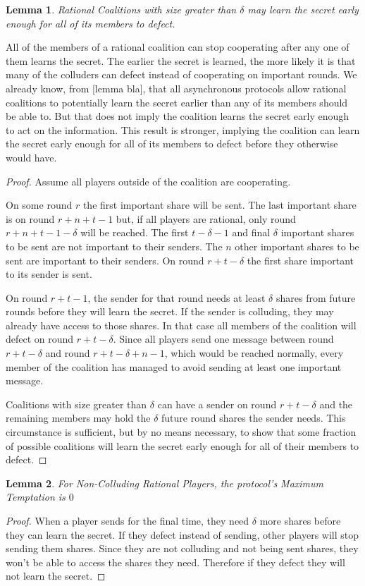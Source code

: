 \documentclass{dalcsthesis}
\newtheorem{lemma}{Lemma}
\begin{document}
\begin{lemma} Rational Coalitions with size greater than $\delta$ may learn the secret early enough for all of its members to defect. \end{lemma}

All of the members of a rational coalition can stop cooperating after any one of them learns the secret. The earlier the secret is learned, the more likely it is that many of the colluders can defect instead of cooperating on important rounds. We already know, from [lemma bla], that all asynchronous protocols allow rational coalitions to potentially learn the secret earlier than any of its members should be able to. But that does not imply the coalition learns the secret early enough to act on the information. This result is stronger, implying the coalition can learn the secret early enough for all of its members to defect before they otherwise would have. 

\begin{proof}
Assume all players outside of the coalition are cooperating.

On some round $r$ the first important share will be sent. The last important share is on round $r+n+t-1$ but, if all players are rational, only round $r+n+t-1-\delta$ will be reached. The first $t-\delta-1$ and final $\delta$ important shares to be sent are not important to their senders. The $n$ other important shares to be sent are important to their senders. On round $r+t-\delta$ the first share important to its sender is sent.

On round $r+t-1$, the sender for that round needs at least $\delta$ shares from future rounds before they will learn the secret. If the sender is colluding, they may already have access to those shares. In that case all members of the coalition will defect on round $r+t-\delta$. Since all players send one message between round $r+t-\delta$ and round $r+t-\delta+n-1$, which would be reached normally, every member of the coalition has managed to avoid sending at least one important message.

Coalitions with size greater than $\delta$ can have a sender on round $r+t-\delta$ and the remaining members may hold the $\delta$ future round shares the sender needs. This circumstance is sufficient, but by no means necessary, to show that some fraction of possible coalitions will learn the secret early enough for all of their members to defect.
\end{proof}

\begin{lemma} For Non-Colluding Rational Players, the protocol's Maximum Temptation is $0$ \end{lemma}
\begin{proof}
When a player sends for the final time, they need $\delta$ more shares before they can learn the secret. If they defect instead of sending, other players will stop sending them shares. Since they are not colluding and not being sent shares, they won't be able to access the shares they need. Therefore if they defect they will not learn the secret.
\end{proof}
\end{document}
